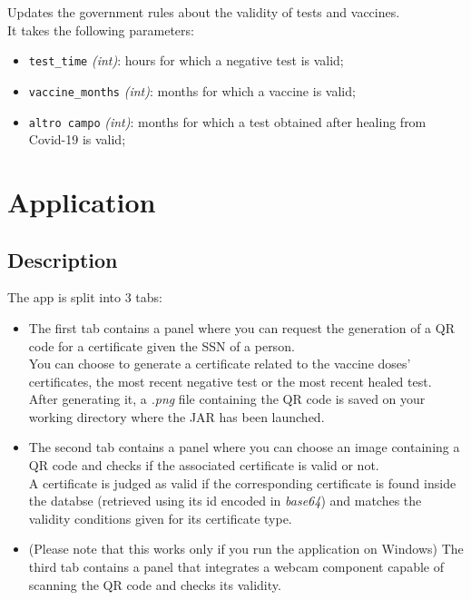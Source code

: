 \documentclass[12pt, a4paper]{article}
\begin{document}
\noindent
Updates the government rules about the validity of tests and vaccines. \\
It takes the following parameters:
\begin{itemize}
    \item \texttt{test\_time} \emph{(int)}: hours for which a negative test is valid;
    \item \texttt{vaccine\_months} \emph{(int)}: months for which a vaccine is valid;
    \item \texttt{altro campo} \emph{(int)}: months for which a test obtained after 
        healing from Covid-19 is valid; 
 \end{itemize}

\clearpage

\section{Application}

\subsection{Description}

The app is split into 3 tabs: 
\begin{itemize}
    \item The first tab contains a panel where you can request the generation of a
        QR code for a certificate given the SSN of a person. \\ 
        You can choose to generate a certificate related to the vaccine doses' 
        certificates, the most recent negative test or the most recent healed test. \\ 
        After generating it, a \emph{.png} file containing the QR code is saved on your 
        working directory where the JAR has been launched. 
    \item The second tab contains a panel where you can choose an image containing a QR 
        code and checks if the associated certificate is valid or not. \\
        A certificate is judged as valid if the corresponding certificate is found inside
        the databse (retrieved using its id encoded in \emph{base64}) and matches the 
        validity conditions given for its certificate type.
    \item (Please note that this works only if you run the application on Windows) The 
        third tab contains a panel that integrates a webcam component capable of 
        scanning the QR code and checks its validity.
\end{itemize}
\end{document}
